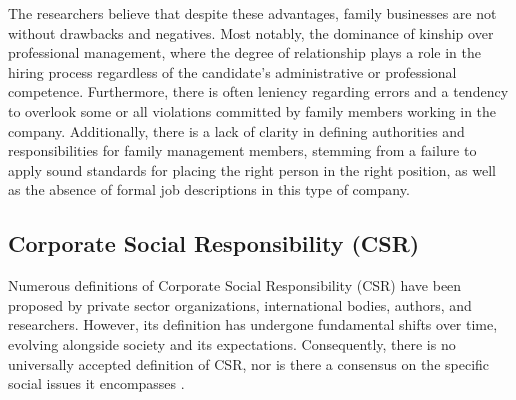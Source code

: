\documentclass[10pt]{NSP1}
\begin{document}
	The researchers believe that despite these advantages, family businesses are not without drawbacks and negatives. Most notably, the dominance of kinship over professional management, where the degree of relationship plays a role in the hiring process regardless of the candidate's administrative or professional competence. Furthermore, there is often leniency regarding errors and a tendency to overlook some or all violations committed by family members working in the company. Additionally, there is a lack of clarity in defining authorities and responsibilities for family management members, stemming from a failure to apply sound standards for placing the right person in the right position, as well as the absence of formal job descriptions in this type of company.
	
	\subsection{Corporate Social Responsibility (CSR)}
	
	Numerous definitions of Corporate Social Responsibility (CSR) have been proposed by private sector organizations, international bodies, authors, and researchers. However, its definition has undergone fundamental shifts over time, evolving alongside society and its expectations. Consequently, there is no universally accepted definition of CSR, nor is there a consensus on the specific social issues it encompasses \cite{Habbash2018}.
	
\end{document}
